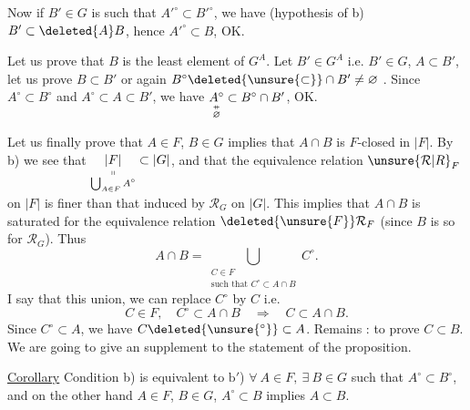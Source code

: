 Now if $B'\in G$ is such that $A'^\circ\subset B'^\circ$, we have  (hypothesis of b) $B'\subset \deleted{A}B$, hence $A'^\circ\subset B$, OK.

Let us prove that $B$ is the least element of $G^A$. Let $B'\in G^A$ i.e. $B'\in G$, $A\subset B'$, let us prove $B\subset B'$ or again $B^\circ\deleted{\unsure{\subset}}\cap B'\ne\varnothing$ . Since
$A^\circ\subset B^\circ$ and $A^\circ\subset A\subset B'$, we have $\underset{\substack{\mathrel{\ooalign{\hfil$\scriptstyle\shortparallel$\hfil\cr\hfil$\scriptstyle-$\hfil\cr}}\\ \varnothing}}{A^\circ}\subset B^\circ\cap B'$, OK.

Let us finally prove that $A\in F$, $B\in G$ implies that $A\cap B$ is $F$-closed in $|F|$. By b) we see that $\underset{\substack{\shortparallel\\ \bigcup_{A\in F}A^\circ}}{|F|}\subset|G|$, and that
the equivalence relation $\unsure{\mathcal R|R}_F$ on $|F|$ is finer than that induced by $\mathcal R_G$ on $|G|$. This implies that $A\cap B$ is saturated for the equivalence relation $\deleted{\unsure{F}}\mathcal R_F$ (since $B$ is so for $\mathcal R_G$). Thus
\[ A\cap B=\bigcup_{\substack{C\in F\\ \text{such that } C^\circ\subset A\cap B}} C^\circ . \]
I say that  this union,  we can replace $C^\circ$ by $C$ i.e.
\[ C\in F,\quad C^\circ\subset A\cap B\quad\Longrightarrow\quad C\subset A\cap B. \]
Since $C^\circ\subset A$, we have $C\deleted{\unsure{{}^\circ}}\subset A$. Remains : to prove $C\subset B$. We are going to give an  supplement to the statement of the proposition.

\uline{Corollary} Condition b) is equivalent to
$\mathrm{b}'$) $\forall\ A\in F,\ \exists\ B\in G$ such that $A^\circ\subset B^\circ$, and on the other hand $A\in F$, $B\in G$, $A^\circ\subset B$ implies $A\subset B$.
